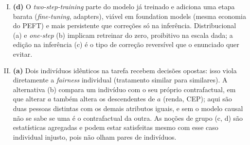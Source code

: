 \documentclass{dlproblemset}
\begin{document}
\begin{enumerate}[I)]
    \item \textbf{(d)} O \textit{two-step-training} parte do modelo já treinado e adiciona uma etapa barata (\textit{fine-tuning}, adapters), viável em foundation models (mesma economia do PEFT) e mais persistente que correções só na inferência. Distribucional (a) e \textit{one-step} (b) implicam retreinar do zero, proibitivo na escala dada; a edição na inferência (c) é o tipo de correção reversível que o enunciado quer evitar.

    \item \textbf{(a)} Dois indivíduos idênticos na tarefa recebem decisões opostas: isso viola diretamente a \textit{fairness} individual (tratamento similar para similares). A alternativa (b) compara um indivíduo com o seu próprio contrafactual, em que alterar $a$ também altera os descendentes de $a$ (renda, CEP); aqui são duas pessoas distintas com os demais atributos iguais, e sem o modelo causal não se sabe se uma é o contrafactual da outra. As noções de grupo (c, d) são estatísticas agregadas e podem estar satisfeitas mesmo com esse caso individual injusto, pois não olham pares de indivíduos.
\end{enumerate}
\end{document}
